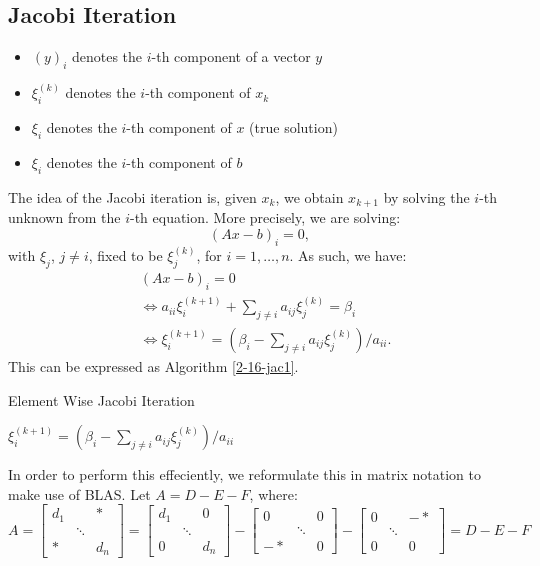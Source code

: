 \documentclass[../main/main.tex]{subfiles}
\begin{document}
\subsection{Jacobi Iteration}
\begin{itemize}
  \item $(y)_{i}$ denotes the $i$-th component of a vector $y$
        \item $\xi_{i}^{(k)}$ denotes the $i$-th component of $x_{k}$
        \item $\xi_{i}$ denotes the $i$-th component of $x$ (true solution)
        \item $\xi_{i}$ denotes the $i$-th component of $b$
\end{itemize}
The idea of the Jacobi iteration is, given $x_{k}$, we obtain $x_{k+1} $ by solving the $i$-th unknown from the $i$-th equation.
More precisely, we are solving: \[
(Ax-b)_{i} = 0,
\] with $\xi_{j}$, $j\neq i$, fixed to be $\xi_{j}^{(k)}$, for $i=1, \ldots , n$. As such, we have:
\begin{align*}
  &(Ax-b)_{i} = 0 \\
  &\iff a_{ii} \xi_{i} ^{(k+1)} + \sum_{j\neq i} a_{ij} \xi_{j}^{(k) } = \beta_{i} \\
    & \iff \xi_{i}^{(k+1)} = (\beta_{i} - \sum_{j\neq i} a_{ij} \xi_{j}^{(k) }) / a_{ii}
  .\end{align*}
This can be expressed as Algorithm \ref{2-16-jac1}.
        \begin{algorithm}[h!]
	\caption{Element Wise Jacobi Iteration}
    \label{2-16-jac1}
	\begin{algorithmic}[1]
      \State $\xi_{i}^{(k+1)} = (\beta_{i} - \sum_{j\neq i} a_{ij} \xi_{j}^{(k) }) / a_{ii}$
      \EndFor
      \EndFor
	\end{algorithmic}
	\end{algorithm}
    In order to perform this effeciently, we reformulate this in matrix notation to make use of BLAS. Let $A=D-E-F$, where:
    \[
A = \begin{bmatrix} d_1 &  & *\\ & \ddots & \\ * & & d_n \end{bmatrix} =  \begin{bmatrix} d_1 &  & 0\\ & \ddots & \\ 0 & & d_n \end{bmatrix}  -  \begin{bmatrix} 0 &  & 0\\ & \ddots & \\ -* & & 0 \end{bmatrix}  -  \begin{bmatrix} 0 &  & -*\\ & \ddots & \\ 0 & & 0 \end{bmatrix}  = D-E-F
    \]
\end{document}
